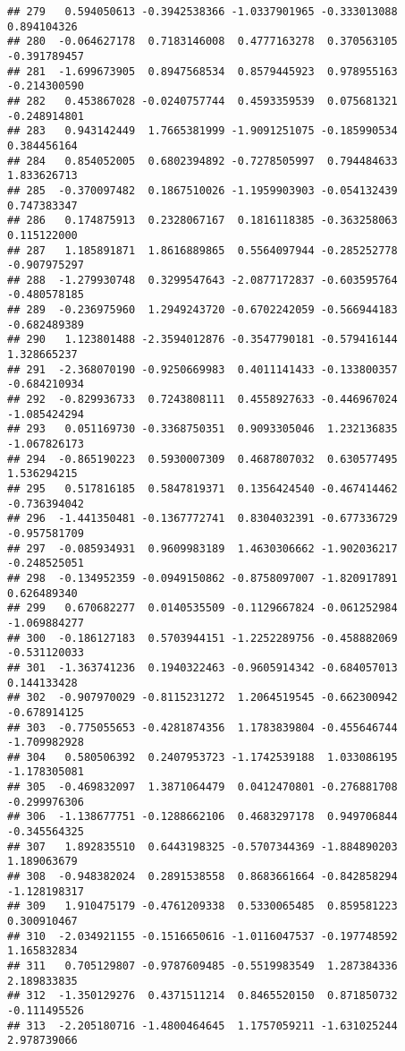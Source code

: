\documentclass[
]{article}
\begin{document}
\begin{verbatim}
## 279   0.594050613 -0.3942538366 -1.0337901965 -0.333013088  0.894104326
## 280  -0.064627178  0.7183146008  0.4777163278  0.370563105 -0.391789457
## 281  -1.699673905  0.8947568534  0.8579445923  0.978955163 -0.214300590
## 282   0.453867028 -0.0240757744  0.4593359539  0.075681321 -0.248914801
## 283   0.943142449  1.7665381999 -1.9091251075 -0.185990534  0.384456164
## 284   0.854052005  0.6802394892 -0.7278505997  0.794484633  1.833626713
## 285  -0.370097482  0.1867510026 -1.1959903903 -0.054132439  0.747383347
## 286   0.174875913  0.2328067167  0.1816118385 -0.363258063  0.115122000
## 287   1.185891871  1.8616889865  0.5564097944 -0.285252778 -0.907975297
## 288  -1.279930748  0.3299547643 -2.0877172837 -0.603595764 -0.480578185
## 289  -0.236975960  1.2949243720 -0.6702242059 -0.566944183 -0.682489389
## 290   1.123801488 -2.3594012876 -0.3547790181 -0.579416144  1.328665237
## 291  -2.368070190 -0.9250669983  0.4011141433 -0.133800357 -0.684210934
## 292  -0.829936733  0.7243808111  0.4558927633 -0.446967024 -1.085424294
## 293   0.051169730 -0.3368750351  0.9093305046  1.232136835 -1.067826173
## 294  -0.865190223  0.5930007309  0.4687807032  0.630577495  1.536294215
## 295   0.517816185  0.5847819371  0.1356424540 -0.467414462 -0.736394042
## 296  -1.441350481 -0.1367772741  0.8304032391 -0.677336729 -0.957581709
## 297  -0.085934931  0.9609983189  1.4630306662 -1.902036217 -0.248525051
## 298  -0.134952359 -0.0949150862 -0.8758097007 -1.820917891  0.626489340
## 299   0.670682277  0.0140535509 -0.1129667824 -0.061252984 -1.069884277
## 300  -0.186127183  0.5703944151 -1.2252289756 -0.458882069 -0.531120033
## 301  -1.363741236  0.1940322463 -0.9605914342 -0.684057013  0.144133428
## 302  -0.907970029 -0.8115231272  1.2064519545 -0.662300942 -0.678914125
## 303  -0.775055653 -0.4281874356  1.1783839804 -0.455646744 -1.709982928
## 304   0.580506392  0.2407953723 -1.1742539188  1.033086195 -1.178305081
## 305  -0.469832097  1.3871064479  0.0412470801 -0.276881708 -0.299976306
## 306  -1.138677751 -0.1288662106  0.4683297178  0.949706844 -0.345564325
## 307   1.892835510  0.6443198325 -0.5707344369 -1.884890203  1.189063679
## 308  -0.948382024  0.2891538558  0.8683661664 -0.842858294 -1.128198317
## 309   1.910475179 -0.4761209338  0.5330065485  0.859581223  0.300910467
## 310  -2.034921155 -0.1516650616 -1.0116047537 -0.197748592  1.165832834
## 311   0.705129807 -0.9787609485 -0.5519983549  1.287384336  2.189833835
## 312  -1.350129276  0.4371511214  0.8465520150  0.871850732 -0.111495526
## 313  -2.205180716 -1.4800464645  1.1757059211 -1.631025244  2.978739066

\end{verbatim}
\end{document}
